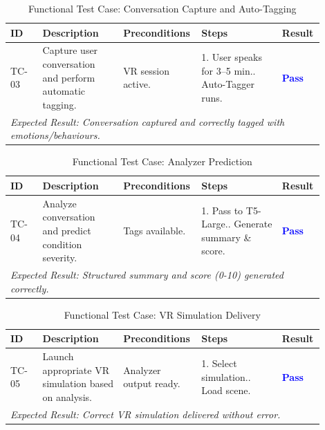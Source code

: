 \begin{table}[H]
\centering
\renewcommand{\arraystretch}{1.3}
\caption{Functional Test Case: Conversation Capture and Auto-Tagging}
\label{tab:tc_conversation_capture}
\begin{tabular}{|p{0.1\linewidth}|p{0.25\linewidth}|p{0.2\linewidth}|p{0.25\linewidth}|p{0.1\linewidth}|}
\hline
\rowcolor{gray!15} \textbf{ID} & \textbf{Description} & \textbf{Preconditions} & \textbf{Steps} & \textbf{Result} \\ \hline
TC-03 & Capture user conversation and perform automatic tagging. & VR session active. & 1. User speaks for 3–5 min.\newline 2. Auto-Tagger runs. & \textcolor{blue}{\textbf{Pass}} \\ \hline
\multicolumn{5}{|p{0.9\linewidth}|}{\textit{Expected Result: Conversation captured and correctly tagged with emotions/behaviours.}} \\ \hline
\end{tabular}
\end{table}

\begin{table}[H]
\centering
\renewcommand{\arraystretch}{1.3}
\caption{Functional Test Case: Analyzer Prediction}
\label{tab:tc_analyzer_prediction}
\begin{tabular}{|p{0.1\linewidth}|p{0.25\linewidth}|p{0.2\linewidth}|p{0.25\linewidth}|p{0.1\linewidth}|}
\hline
\rowcolor{gray!15} \textbf{ID} & \textbf{Description} & \textbf{Preconditions} & \textbf{Steps} & \textbf{Result} \\ \hline
TC-04 & Analyze conversation and predict condition severity. & Tags available. & 1. Pass to T5-Large.\newline 2. Generate summary \& score. & \textcolor{blue}{\textbf{Pass}} \\ \hline
\multicolumn{5}{|p{0.9\linewidth}|}{\textit{Expected Result: Structured summary and score (0-10) generated correctly.}} \\ \hline
\end{tabular}
\end{table}

\begin{table}[H]
\centering
\renewcommand{\arraystretch}{1.3}
\caption{Functional Test Case: VR Simulation Delivery}
\label{tab:tc_simulation_delivery}
\begin{tabular}{|p{0.1\linewidth}|p{0.25\linewidth}|p{0.2\linewidth}|p{0.25\linewidth}|p{0.1\linewidth}|}
\hline
\rowcolor{gray!15} \textbf{ID} & \textbf{Description} & \textbf{Preconditions} & \textbf{Steps} & \textbf{Result} \\ \hline
TC-05 & Launch appropriate VR simulation based on analysis. & Analyzer output ready. & 1. Select simulation.\newline 2. Load scene. & \textcolor{blue}{\textbf{Pass}} \\ \hline
\multicolumn{5}{|p{0.9\linewidth}|}{\textit{Expected Result: Correct VR simulation delivered without error.}} \\ \hline
\end{tabular}
\end{table}

